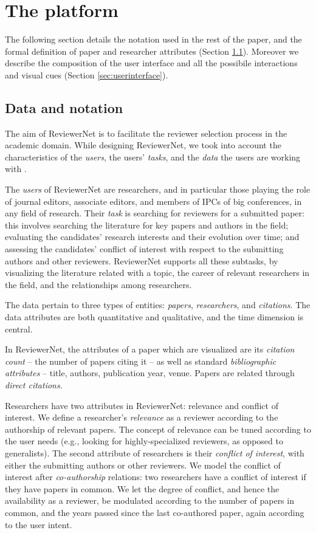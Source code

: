 \chapter{The platform}
\label{sec:platform}

The following section details the notation used in the rest of the paper, and the formal definition of paper and researcher attributes (Section \ref{sec:methods}). Moreover we describe the composition of the user interface and all the possibile interactions and visual cues (Section \ref{sec:userinterface}).
\section{Data and notation}
\label{sec:methods} %

The aim of ReviewerNet is to facilitate the reviewer selection process in the academic domain. While designing ReviewerNet, we took into account the characteristics of the \emph{users}, the users' \emph{tasks}, and the \emph{data} the users are working with \cite{MiAi14}. 

The \emph{users} of ReviewerNet are researchers, and in particular those playing the role of journal editors, associate editors, and members of IPCs of big conferences, in any field of research. Their \emph{task} is searching for reviewers for a submitted paper: this involves searching the literature for key papers and authors in the field; evaluating the candidates' research interests and their evolution over time; and assessing the candidates' conflict of interest with respect to the submitting authors and other reviewers. ReviewerNet supports all these subtasks, by visualizing the literature related with a topic, the career of relevant researchers in the field, and the relationships among researchers. 

The data pertain to three types of entities: \emph{papers}, \emph{researchers}, and \emph{citations}. The data attributes are both quantitative and qualitative, and the time dimension is central. 

In ReviewerNet, the attributes of a paper which are visualized are its \emph{citation count} -- the number of papers citing it -- as well as standard \emph{bibliographic attributes} -- title, authors, publication year, venue. Papers are related through \emph{direct citations}. 

Researchers have two attributes in ReviewerNet: relevance and conflict of interest. We define a researcher's \emph{relevance} as a reviewer according to the authorship of relevant papers. The concept of relevance can be tuned according to the user needs (e.g., looking for highly-specialized reviewers, as opposed to generalists). The second attribute of researchers is their \emph{conflict of interest}, with either the submitting authors or other reviewers. We model the conflict of interest after \emph{co-authorship} relations: two researchers have a conflict of interest if they have papers in common. We let the degree of conflict, and hence the availability as a reviewer, be modulated according to the number of papers in common, and the years passed since the last co-authored paper, again according to the user intent. 

